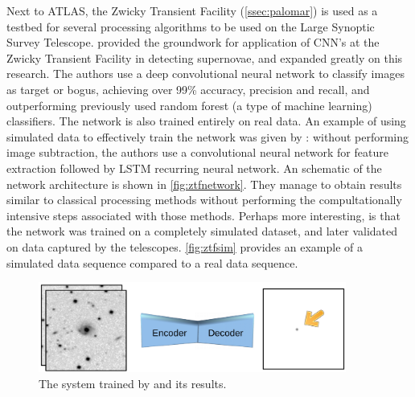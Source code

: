 Next to ATLAS, the Zwicky Transient Facility (\autoref{ssec:palomar}) is used as a testbed for several processing algorithms to be used on the Large Synoptic Survey Telescope. \cite{supernovacnn} provided the groundwork for application of CNN's at the Zwicky Transient Facility in detecting supernovae, and \cite{processingDLone} expanded greatly on this research. The authors use a deep convolutional neural network to classify images as target or bogus, achieving over 99\% accuracy, precision and recall, and outperforming previously used random forest (a type of machine learning) classifiers. The network is also trained entirely on real data. An example of using simulated data to effectively train the network was given by \cite{processingDLtwo}: without performing image subtraction, the authors use a convolutional neural network for feature extraction followed by LSTM recurring neural network. An schematic of the network architecture is shown in \autoref{fig:ztfnetwork}. They manage to obtain results similar to classical processing methods without performing the compultationally intensive steps associated with those methods. Perhaps more interesting, is that the network was trained on a completely simulated dataset, and later validated on data captured by the telescopes. \autoref{fig:ztfsim} provides an example of a simulated data sequence compared to a real data sequence. \\

\begin{figure}[htbp]
    \centering
    \includegraphics[width=0.9\textwidth]{images/encdec.png}
    \caption{The system trained by \cite{autoencoder} and its results.}
    \label{fig:autoencoder}
\end{figure}

